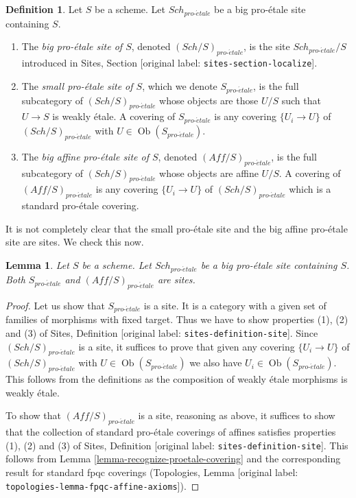 \documentclass[10pt,a4paper]{article}
\theoremstyle{plain}
\newtheorem{lemma}[subsection]{Lemma}
\theoremstyle{definition}
\newtheorem{definition}[subsection]{Definition}
\theoremstyle{remark}
\numberwithin{equation}{subsection}
\def\Sch{\mathit{Sch}}
\def\Ob{\mathop{\mathrm{Ob}}\nolimits}
\def\proetale{{pro\text{-}\acute{e}tale}}
\begin{document}
\begin{definition}
\label{definition-big-small-proetale}
Let $S$ be a scheme. Let $\Sch_\proetale$ be a big pro-\'etale
site containing $S$.
\begin{enumerate}
\item The {\it big pro-\'etale site of $S$}, denoted
$(\Sch/S)_\proetale$, is the site $\Sch_\proetale/S$
introduced in Sites, Section \textnormal{[original label: \nolinkurl{sites-section-localize}]}.
\item The {\it small pro-\'etale site of $S$}, which we denote
$S_\proetale$, is the full subcategory of $(\Sch/S)_\proetale$
whose objects are those $U/S$ such that $U \to S$ is weakly \'etale.
A covering of $S_\proetale$ is any covering $\{U_i \to U\}$ of
$(\Sch/S)_\proetale$ with $U \in \Ob(S_\proetale)$.
\item The {\it big affine pro-\'etale site of $S$}, denoted
$(\textit{Aff}/S)_\proetale$, is the full subcategory of
$(\Sch/S)_\proetale$ whose objects are affine $U/S$.
A covering of $(\textit{Aff}/S)_\proetale$ is any covering
$\{U_i \to U\}$ of $(\Sch/S)_\proetale$ which is a
standard pro-\'etale covering.
\end{enumerate}
\end{definition}

\noindent
It is not completely clear that the small pro-\'etale site and
the big affine pro-\'etale site are sites. We check this now.

\begin{lemma}
\label{lemma-verify-site-proetale}
Let $S$ be a scheme. Let $\Sch_\proetale$ be a big pro-\'etale site
containing $S$. Both $S_\proetale$ and $(\textit{Aff}/S)_\proetale$ are sites.
\end{lemma}

\begin{proof}
Let us show that $S_\proetale$ is a site. It is a category with a
given set of families of morphisms with fixed target. Thus we
have to show properties (1), (2) and (3) of
Sites, Definition \textnormal{[original label: \nolinkurl{sites-definition-site}]}.
Since $(\Sch/S)_\proetale$ is a site, it suffices to prove
that given any covering $\{U_i \to U\}$ of $(\Sch/S)_\proetale$
with $U \in \Ob(S_\proetale)$ we also have $U_i \in \Ob(S_\proetale)$.
This follows from the definitions
as the composition of weakly \'etale morphisms is weakly \'etale.

\medskip\noindent
To show that $(\textit{Aff}/S)_\proetale$ is a site, reasoning as above,
it suffices to show that the collection of standard pro-\'etale coverings
of affines satisfies properties (1), (2) and (3) of
Sites, Definition \textnormal{[original label: \nolinkurl{sites-definition-site}]}.
This follows from Lemma \ref{lemma-recognize-proetale-covering}
and the corresponding result for standard fpqc coverings
(Topologies, Lemma \textnormal{[original label: \nolinkurl{topologies-lemma-fpqc-affine-axioms}]}).
\end{proof}
\end{document}

